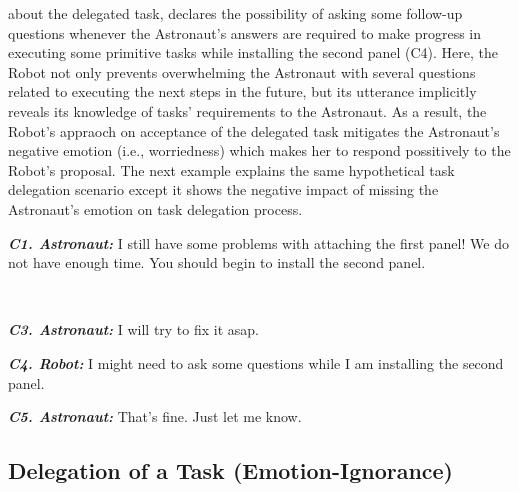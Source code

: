 about the delegated task, declares the possibility of asking some follow-up
questions whenever the Astronaut's answers are required to make progress in
executing some primitive tasks while installing the second panel (C4). Here, the
Robot not only prevents overwhelming the Astronaut with several questions
related to executing the next steps in the future, but its utterance implicitly
reveals its knowledge of tasks' requirements to the Astronaut. As a result, the
Robot's appraoch on acceptance of the delegated task mitigates the Astronaut's
negative emotion (i.e., worriedness) which makes her to respond possitively to
the Robot's proposal. The next example explains the same hypothetical task
delegation scenario except it shows the negative impact of missing the
Astronaut's emotion on task delegation process.\\

\begin{spacing}{1.2}
\small{
\begin{description}
  \item \textit{\textbf{C1. Astronaut:}} I still have some problems with
  attaching the first panel! We do not have enough time. You should begin to
  install the second panel.\\

  \item {}\\
  
  \item \textit{\textbf{C3. Astronaut:}} I will try to fix it asap.\\

  \item \textit{\textbf{C4. Robot:}} I might need to ask some questions while I
  am installing the second panel.\\

  \item \textit{\textbf{C5. Astronaut:}} That's fine. Just let me know.
  
\end{description}
}
\end{spacing}

\subsection{Delegation of a Task (Emotion-Ignorance)}
\label{sec:exp4}

